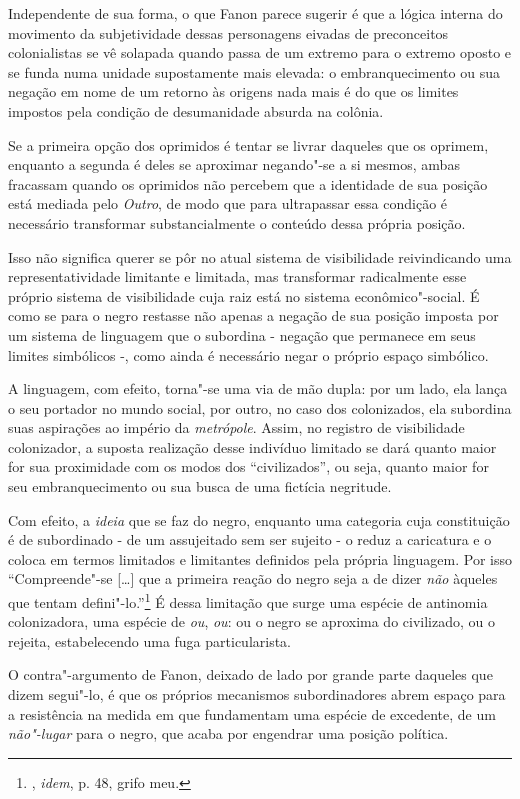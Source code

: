 Independente de sua forma, o que Fanon parece sugerir é que a lógica
interna do movimento da subjetividade dessas personagens eivadas de
preconceitos colonialistas se vê solapada quando passa de um extremo
para o extremo oposto e se funda numa unidade supostamente mais elevada:
o embranquecimento ou sua negação em nome de um retorno às origens nada
mais é do que os limites impostos pela condição de desumanidade absurda
na colônia.

Se a primeira opção dos oprimidos é tentar se livrar daqueles que os
oprimem, enquanto a segunda é deles se aproximar negando"-se a si mesmos,
ambas fracassam quando os oprimidos não percebem que a identidade de sua
posição está mediada pelo \emph{Outro}, de modo que para ultrapassar
essa condição é necessário transformar substancialmente o conteúdo dessa
própria posição.

Isso não significa querer se pôr no atual sistema de visibilidade
reivindicando uma representatividade limitante e limitada, mas
transformar radicalmente esse próprio sistema de visibilidade cuja raiz
está no sistema econômico"-social. É como se para o negro restasse não
apenas a negação de sua posição imposta por um sistema de linguagem que
o subordina - negação que permanece em seus limites simbólicos -, como
ainda é necessário negar o próprio espaço simbólico.

A linguagem, com efeito, torna"-se uma via de mão dupla: por um lado, ela
lança o seu portador no mundo social, por outro, no caso dos
colonizados, ela subordina suas aspirações ao império da
\emph{metrópole}. Assim, no registro de visibilidade colonizador, a
suposta realização desse indivíduo limitado se dará quanto maior for sua
proximidade com os modos dos ``civilizados'', ou seja, quanto maior for
seu embranquecimento ou sua busca de uma fictícia negritude.

Com efeito, a \emph{ideia} que se faz do negro, enquanto uma categoria
cuja constituição é de subordinado - de um assujeitado sem ser sujeito -
o reduz a caricatura e o coloca em termos limitados e limitantes
definidos pela própria linguagem. Por isso ``Compreende"-se {[}\ldots{}{]} que
a primeira reação do negro seja a de dizer \emph{não} àqueles que tentam
defini"-lo.''\footnote{, \emph{idem}, p. 48, grifo meu.} É dessa limitação
que surge uma espécie de antinomia colonizadora, uma espécie de
\emph{ou}, \emph{ou}: ou o negro se aproxima do civilizado, ou o
rejeita, estabelecendo uma fuga particularista.

O contra"-argumento de Fanon, deixado de lado por grande parte daqueles
que dizem segui"-lo, é que os próprios mecanismos subordinadores abrem
espaço para a resistência na medida em que fundamentam uma espécie de
excedente, de um \emph{não"-lugar} para o negro, que acaba por engendrar
uma posição política.

